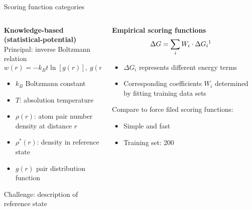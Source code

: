\begin{appendixframe}{Scoring function categories}

\begin{columns}[T]
\begin{column}{0.45\textwidth}
\textbf{Knowledge-based (statistical-potential)}\\
Principal: inverse Boltzmann relation
\begin{equation*}
w(r) = - k_B t \ln [g(r)], ~ g(r) = \rho (r)/\rho^\ast (r)  
\end{equation*}

\begin{itemize}
    \item $k_B$ Boltzmann constant
    \item $T$: absolution temperature
    \item $\rho(r)$: atom pair number density at distance $r$
    \item $\rho^\ast(r)$: density in reference state %
    \item $g(r)$ pair distribution function
\end{itemize}
Challenge: description of reference state
\end{column}
\hspace{1em}
\begin{column}{0.45\textwidth}
\textbf{Empirical scoring functions}
\begin{equation*}
\Delta G = \sum_{\substack{i}} W_i \cdot \Delta G_i \footnotemark[1]
\end{equation*}

\begin{itemize}
    \item $\Delta G_i$ represents different energy terms
    \item Corresponding coefficients $W_i$ determined by fitting training data sets
\end{itemize}

Compare to force filed scoring functions: 
\begin{itemize}
    \item Simple and fast
    \item Training set: 200
\end{itemize}
\end{column}
\end{columns}
\end{appendixframe}


